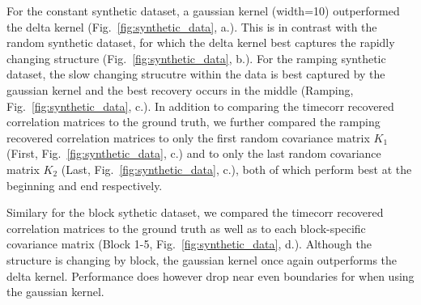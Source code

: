 \documentclass[english]{article}
\begin{document}
For the constant synthetic dataset, a gaussian kernel (width=10)
outperformed the delta kernel (Fig.~\ref{fig:synthetic_data},  a.).  This is in contrast with the random
synthetic dataset, for which the delta kernel best captures the
rapidly changing structure (Fig.~\ref{fig:synthetic_data},  b.). For
the ramping synthetic dataset, the slow changing strucutre within the
data is best
captured by the gaussian kernel and the best recovery occurs in the
middle (Ramping, Fig.~\ref{fig:synthetic_data},
c.). In addition to comparing the timecorr recovered correlation
matrices to the ground truth, we
further compared the ramping recovered correlation matrices to only the first random covariance matrix $K_{1}$
(First, Fig.~\ref{fig:synthetic_data},  c.) and to only the last
random covariance matrix $K_{2}$ (Last, Fig.~\ref{fig:synthetic_data},
c.), both of which perform best at the beginning and end respectively.

Similary for the block sythetic dataset, we compared the timecorr
recovered correlation matrices to the ground truth as well as to each
block-specific covariance matrix (Block 1-5,
Fig.~\ref{fig:synthetic_data},  d.).  Although the structure is
changing by block, the gaussian kernel once again outperforms the
delta kernel.  Performance does however drop near even boundaries for
when using the gaussian kernel. 
\end{document}
